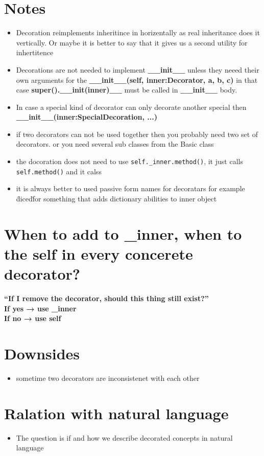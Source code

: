 \documentclass[a4paper]{article}
\begin{document}
    \section{Notes}
        \begin{itemize}
            \item Decoration reimplements inheritince in horizentally as real inheritance does it vertically. Or maybe it is better to say that it gives us a second utility for inhertitence
            \item Decorations are not needed to implement \textbf{\_\_init\_\_} unless they neeed their own arguments for the \textbf{\_\_init\_\_(self, inner:Decorator, a, b, c)} in that case \textbf{super().\_\_init(inner)\_\_} must be called in \textbf{\_\_init\_\_} body.
            \item In case a special kind of decorator can only decorate another special then \textbf{\_\_init\_\_(inner:SpecialDecoration, ...)}
            \item if two decorators can not be used together then you probably need two set of decorators. or you need several sub classes from the Basic class
            \item the docoration does not need to use \texttt{self.\_inner.method()}, it just calls \texttt{self.method()} and it calss
            \item  it is always better to used passive form names for decoratars for example \"diced\" for something that adds dictionary abilities to inner object
        \end{itemize}
    
    \section{When to add to \_inner, when to the self in every concerete decorator?}
        \textbf{“If I remove the decorator, should this thing still exist?”
        \\
        If yes → use \_inner
        \\
        If no → use self
        }
    
    \section{Downsides}
        \begin{itemize}
            \item sometime two decorators are inconsistenet with each other
        \end{itemize}
    
    \section{Ralation with natural language}
        \begin{itemize}
            \item The question is if and how we describe decorated concepts in natural language
        \end{itemize}
\end{document}
